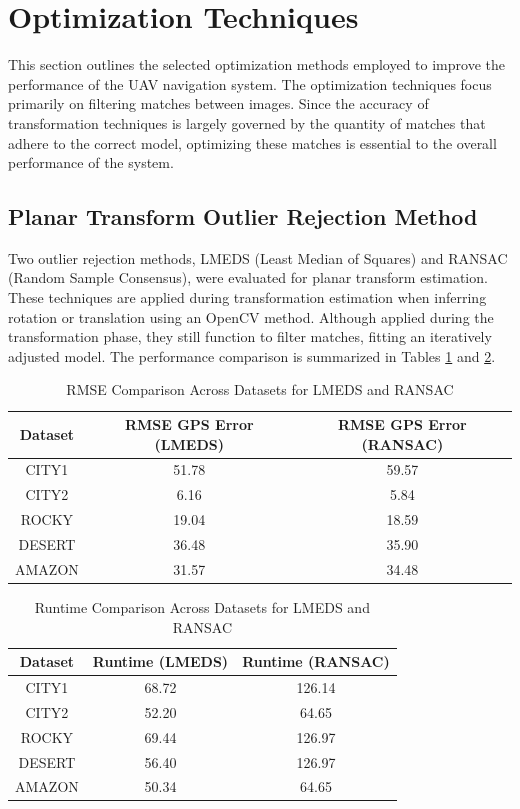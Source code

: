\section{Optimization Techniques}

This section outlines the selected optimization methods employed to improve the performance of the UAV navigation system. The optimization techniques focus primarily on filtering matches between images. Since the accuracy of transformation techniques is largely governed by the quantity of matches that adhere to the correct model, optimizing these matches is essential to the overall performance of the system.


\subsection{Planar Transform Outlier Rejection Method}

Two outlier rejection methods, LMEDS (Least Median of Squares) and RANSAC (Random Sample Consensus), were evaluated for planar transform estimation. These techniques are applied during transformation estimation when inferring rotation or translation using an OpenCV method. Although applied during the transformation phase, they still function to filter matches, fitting an iteratively adjusted model. The performance comparison is summarized in Tables \ref{tab:rmse_comparison_opt} and \ref{tab:runtime_comparison_opt}.


\begin{table}[H]
    \centering
    \caption{RMSE Comparison Across Datasets for LMEDS and RANSAC}
    \label{tab:rmse_comparison_opt}
    \begin{tabular}{|c|c|c|}
    \hline
    \textbf{Dataset} & \textbf{RMSE GPS Error (LMEDS)} & \textbf{RMSE GPS Error (RANSAC)} \\ \hline
    CITY1   & 51.78 & 59.57 \\ \hline
    CITY2   & 6.16  & 5.84  \\ \hline
    ROCKY   & 19.04 & 18.59 \\ \hline
    DESERT  & 36.48 & 35.90 \\ \hline
    AMAZON  & 31.57 & 34.48 \\ \hline
    \end{tabular}
\end{table}

\begin{table}[H]
    \centering
    \caption{Runtime Comparison Across Datasets for LMEDS and RANSAC}
    \label{tab:runtime_comparison_opt}
    \begin{tabular}{|c|c|c|}
    \hline
    \textbf{Dataset} & \textbf{Runtime (LMEDS)} & \textbf{Runtime (RANSAC)} \\ \hline
    CITY1   & 68.72 & 126.14 \\ \hline
    CITY2   & 52.20 & 64.65  \\ \hline
    ROCKY   & 69.44 & 126.97 \\ \hline
    DESERT  & 56.40 & 126.97 \\ \hline
    AMAZON  & 50.34 & 64.65  \\ \hline
    \end{tabular}
\end{table}


